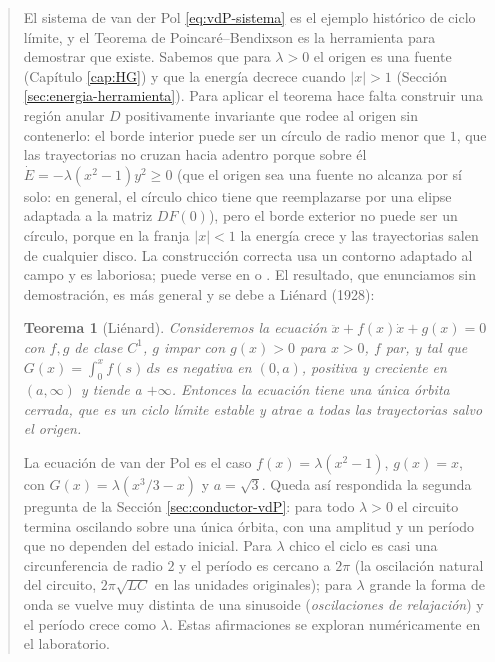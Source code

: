 \documentclass[12pt, a4paper]{amsbook}
\newtheorem{teo}{Teorema}[section]
\theoremstyle{remark}
\theoremstyle{definition}
\numberwithin{section}{chapter}
\numberwithin{subsection}{section}
\numberwithin{equation}{section}
\numberwithin{figure}{chapter}
\newenvironment{volvemos}[1]{\medskip\par\noindent\begin{quote}\noindent{\bf Volvemos al problema: #1.}\par\smallskip}{\end{quote}\medskip}
\begin{document}
\begin{volvemos}{el circuito}
El sistema de van der Pol \eqref{eq:vdP-sistema} es el ejemplo histórico de ciclo límite, y el Teorema de Poincaré--Bendixson es la herramienta para demostrar que existe. Sabemos que para $\lambda>0$ el origen es una fuente (Capítulo \ref{cap:HG}) y que la energía decrece cuando $|x|>1$ (Sección \ref{sec:energia-herramienta}). Para aplicar el teorema hace falta construir una región anular $D$ positivamente invariante que rodee al origen sin contenerlo: el borde interior puede ser un círculo de radio menor que $1$, que las trayectorias no cruzan hacia adentro porque sobre él $\dot E=-\lambda(x^2-1)y^2\ge 0$ (que el origen sea una fuente no alcanza por sí solo: en general, el círculo chico tiene que reemplazarse por una elipse adaptada a la matriz $DF(0)$), pero el borde exterior no puede ser un círculo, porque en la franja $|x|<1$ la energía crece y las trayectorias salen de cualquier disco. La construcción correcta usa un contorno adaptado al campo y es laboriosa; puede verse en \cite{Strogatz} o \cite{Perko}. El resultado, que enunciamos sin demostración, es más general y se debe a Liénard (1928):

\begin{teo}[Liénard]\label{teo:lienard}
Consideremos la ecuación $\ddot x + f(x)\dot x + g(x) = 0$ con $f,g$ de clase $C^1$, $g$ impar con $g(x)>0$ para $x>0$, $f$ par, y tal que $G(x) = \int_0^x f(s)\,ds$ es negativa en $(0,a)$, positiva y creciente en $(a,\infty)$ y tiende a $+\infty$. Entonces la ecuación tiene una única órbita cerrada, que es un ciclo límite estable y atrae a todas las trayectorias salvo el origen.
\end{teo}

La ecuación de van der Pol es el caso $f(x) = \lambda(x^2-1)$, $g(x)=x$, con $G(x) = \lambda(x^3/3 - x)$ y $a=\sqrt3$. Queda así respondida la segunda pregunta de la Sección \ref{sec:conductor-vdP}: para todo $\lambda>0$ el circuito termina oscilando sobre una única órbita, con una amplitud y un período que no dependen del estado inicial. Para $\lambda$ chico el ciclo es casi una circunferencia de radio $2$ y el período es cercano a $2\pi$ (la oscilación natural del circuito, $2\pi\sqrt{LC}$ en las unidades originales); para $\lambda$ grande la forma de onda se vuelve muy distinta de una sinusoide (\emph{oscilaciones de relajación}) y el período crece como $\lambda$. Estas afirmaciones se exploran numéricamente en el laboratorio.
\end{volvemos}
\end{document}
